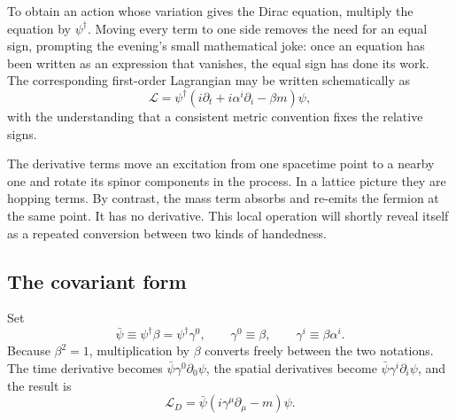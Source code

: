 To obtain an action whose variation gives the Dirac equation, multiply the
equation by \(\psi^\dagger\). Moving every term to one side removes the need
for an equal sign, prompting the evening's small mathematical joke: once an
equation has been written as an expression that vanishes, the equal sign
has done its work. The corresponding first-order Lagrangian may be written
schematically as
\begin{equation}
  \mathcal L
  =
  \psi^\dagger
  \left(i\partial_t+i\alpha^i\partial_i-\beta m\right)\psi ,
  \label{eq:l10-dirac-old-lagrangian}
\end{equation}
with the understanding that a consistent metric convention fixes the
relative signs.

The derivative terms move an excitation from one spacetime point to a
nearby one and rotate its spinor components in the process. In a lattice
picture they are hopping terms. By contrast, the mass term absorbs and
re-emits the fermion at the same point. It has no derivative. This local
operation will shortly reveal itself as a repeated conversion between two
kinds of handedness.

\begin{classroomqa}
\end{classroomqa}

\subsection{The covariant form}

Set
\begin{equation}
  \bar\psi\equiv\psi^\dagger\beta
  =\psi^\dagger\gamma^0,
  \qquad
  \gamma^0\equiv\beta,
  \qquad
  \gamma^i\equiv\beta\alpha^i .
  \label{eq:l10-dirac-adjoint}
\end{equation}
Because \(\beta^2=1\), multiplication by \(\beta\) converts freely between
the two notations. The time derivative becomes
\(\bar\psi\gamma^0\partial_0\psi\), the spatial derivatives become
\(\bar\psi\gamma^i\partial_i\psi\), and the result is
\begin{equation}
  \boxed{\mathcal L_D
  =\bar\psi\left(i\gamma^\mu\partial_\mu-m\right)\psi .}
  \label{eq:l10-covariant-dirac}
\end{equation}

